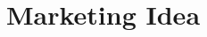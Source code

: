 \documentclass[12pt]{article}
\begin{document}

\section{Marketing Idea}


\twocolumn
\end{document}

